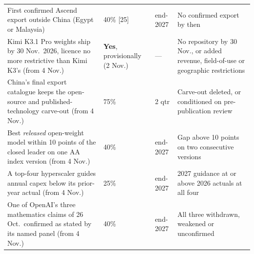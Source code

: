 {\begin{longtable}{@{}p{78mm}p{11mm}p{13mm}p{44mm}@{}}
First confirmed Ascend export outside China (Egypt or Malaysia) & 40\% [25] & end-2027 & No confirmed export by then \\
Kimi K3.1 Pro weights ship by 30 Nov.\ 2026, licence no more restrictive than Kimi K3's (from 4 Nov.) & \textbf{Yes}, provisionally (2 Nov.) & --- & No repository by 30 Nov., or added revenue, field-of-use or geographic restrictions \\
China's final export catalogue keeps the open-source and published-technology carve-out (from 4 Nov.) & 75\% & 2 qtr & Carve-out deleted, or conditioned on pre-publication review \\
Best \emph{released} open-weight model within 10 points of the closed leader on one AA index version (from 4 Nov.) & 40\% & end-2027 & Gap above 10 points on two consecutive versions \\
A top-four hyperscaler guides annual capex below its prior-year actual (from 4 Nov.) & 25\% & end-2027 & 2027 guidance at or above 2026 actuals at all four \\
One of OpenAI's three mathematics claims of 26 Oct.\ confirmed as stated by its named panel (from 4 Nov.) & 40\% & end-2027 & All three withdrawn, weakened or unconfirmed \\
\end{longtable}
}

